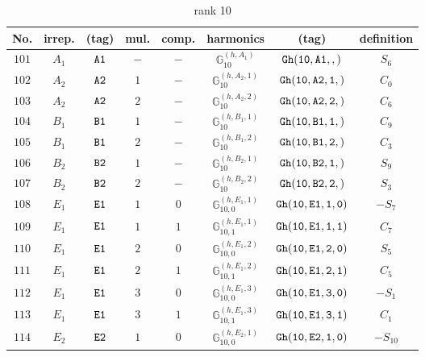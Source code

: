 \documentclass[fleqn,8pt]{jsarticle}
\begin{document}
\begin{table}[ht!]
\begin{center}
\caption{rank 10}
\renewcommand{\arraystretch}{1.3}
\begin{tabular}{cccccccc} \hline \hline
No. & irrep. & (tag) & mul. & comp. & harmonics & (tag) & definition \\ \hline
$ 101 $ & $ A_{1} $ & $ {\tt A1} $ & $ - $ & $ - $ & $ \mathbb{G}_{10}^{(h,A_{1})} $ & $ {\tt Gh(10,A1,,)} $ & $ S_{6} $ \\
$ 102 $ & $ A_{2} $ & $ {\tt A2} $ & $ 1 $ & $ - $ & $ \mathbb{G}_{10}^{(h,A_{2},1)} $ & $ {\tt Gh(10,A2,1,)} $ & $ C_{0} $ \\
$ 103 $ & $ A_{2} $ & $ {\tt A2} $ & $ 2 $ & $ - $ & $ \mathbb{G}_{10}^{(h,A_{2},2)} $ & $ {\tt Gh(10,A2,2,)} $ & $ C_{6} $ \\
$ 104 $ & $ B_{1} $ & $ {\tt B1} $ & $ 1 $ & $ - $ & $ \mathbb{G}_{10}^{(h,B_{1},1)} $ & $ {\tt Gh(10,B1,1,)} $ & $ C_{9} $ \\
$ 105 $ & $ B_{1} $ & $ {\tt B1} $ & $ 2 $ & $ - $ & $ \mathbb{G}_{10}^{(h,B_{1},2)} $ & $ {\tt Gh(10,B1,2,)} $ & $ C_{3} $ \\
$ 106 $ & $ B_{2} $ & $ {\tt B2} $ & $ 1 $ & $ - $ & $ \mathbb{G}_{10}^{(h,B_{2},1)} $ & $ {\tt Gh(10,B2,1,)} $ & $ S_{9} $ \\
$ 107 $ & $ B_{2} $ & $ {\tt B2} $ & $ 2 $ & $ - $ & $ \mathbb{G}_{10}^{(h,B_{2},2)} $ & $ {\tt Gh(10,B2,2,)} $ & $ S_{3} $ \\
$ 108 $ & $ E_{1} $ & $ {\tt E1} $ & $ 1 $ & $ 0 $ & $ \mathbb{G}_{10,0}^{(h,E_{1},1)} $ & $ {\tt Gh(10,E1,1,0)} $ & $ - S_{7} $ \\
$ 109 $ & $ E_{1} $ & $ {\tt E1} $ & $ 1 $ & $ 1 $ & $ \mathbb{G}_{10,1}^{(h,E_{1},1)} $ & $ {\tt Gh(10,E1,1,1)} $ & $ C_{7} $ \\
$ 110 $ & $ E_{1} $ & $ {\tt E1} $ & $ 2 $ & $ 0 $ & $ \mathbb{G}_{10,0}^{(h,E_{1},2)} $ & $ {\tt Gh(10,E1,2,0)} $ & $ S_{5} $ \\
$ 111 $ & $ E_{1} $ & $ {\tt E1} $ & $ 2 $ & $ 1 $ & $ \mathbb{G}_{10,1}^{(h,E_{1},2)} $ & $ {\tt Gh(10,E1,2,1)} $ & $ C_{5} $ \\
$ 112 $ & $ E_{1} $ & $ {\tt E1} $ & $ 3 $ & $ 0 $ & $ \mathbb{G}_{10,0}^{(h,E_{1},3)} $ & $ {\tt Gh(10,E1,3,0)} $ & $ - S_{1} $ \\
$ 113 $ & $ E_{1} $ & $ {\tt E1} $ & $ 3 $ & $ 1 $ & $ \mathbb{G}_{10,1}^{(h,E_{1},3)} $ & $ {\tt Gh(10,E1,3,1)} $ & $ C_{1} $ \\
$ 114 $ & $ E_{2} $ & $ {\tt E2} $ & $ 1 $ & $ 0 $ & $ \mathbb{G}_{10,0}^{(h,E_{2},1)} $ & $ {\tt Gh(10,E2,1,0)} $ & $ - S_{10} $ \\

\end{tabular}
\end{center}
\end{table}
\end{document}
